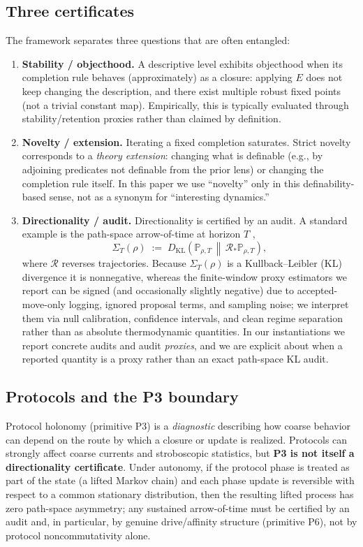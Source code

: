 \documentclass[11pt]{article}
\newcommand{\KL}{D_{\mathrm{KL}}}
\newcommand{\Sig}{\Sigma}
\begin{document}
\subsection{Three certificates}\label{sec:framework:certificates}
The framework separates three questions that are often entangled:
\begin{enumerate}[leftmargin=*]
\item \textbf{Stability / objecthood.} A descriptive level exhibits objecthood when its completion rule behaves (approximately) as a closure: applying $E$ does not keep changing the description, and there exist multiple robust fixed points (not a trivial constant map). Empirically, this is typically evaluated through stability/retention proxies rather than claimed by definition.
\item \textbf{Novelty / extension.} Iterating a fixed completion saturates. Strict novelty corresponds to a \emph{theory extension}: changing what is definable (e.g., by adjoining predicates not definable from the prior lens) or changing the completion rule itself. In this paper we use ``novelty'' only in this definability-based sense, not as a synonym for ``interesting dynamics.''
\item \textbf{Directionality / audit.} Directionality is certified by an audit. A standard example is the path-space arrow-of-time at horizon $T$ \citep{LebowitzSpohn1999,Seifert2012},
\[
\Sig_T(\rho)\;:=\;\KL\!\left(\mathbb P_{\rho,T}\,\middle\|\,\mathcal R_{*}\mathbb P_{\rho,T}\right),
\]
where $\mathcal R$ reverses trajectories. Because $\Sig_T(\rho)$ is a Kullback--Leibler (KL) divergence it is nonnegative, whereas the finite-window proxy estimators we report can be signed (and occasionally slightly negative) due to accepted-move-only logging, ignored proposal terms, and sampling noise; we interpret them via null calibration, confidence intervals, and clean regime separation rather than as absolute thermodynamic quantities.
In our instantiations we report concrete audits and audit \emph{proxies}, and we are explicit about when a reported quantity is a proxy rather than an exact path-space KL audit.
\end{enumerate}

\subsection{Protocols and the P3 boundary}\label{sec:framework:p3boundary}
Protocol holonomy (primitive P3) is a \emph{diagnostic} describing how coarse behavior can depend on the route by which a closure or update is realized. Protocols can strongly affect coarse currents and stroboscopic statistics, but \textbf{P3 is not itself a directionality certificate}. Under autonomy, if the protocol phase is treated as part of the state (a lifted Markov chain) and each phase update is reversible with respect to a common stationary distribution, then the resulting lifted process has zero path-space asymmetry; any sustained arrow-of-time must be certified by an audit and, in particular, by genuine drive/affinity structure (primitive P6), not by protocol noncommutativity alone.
\end{document}
